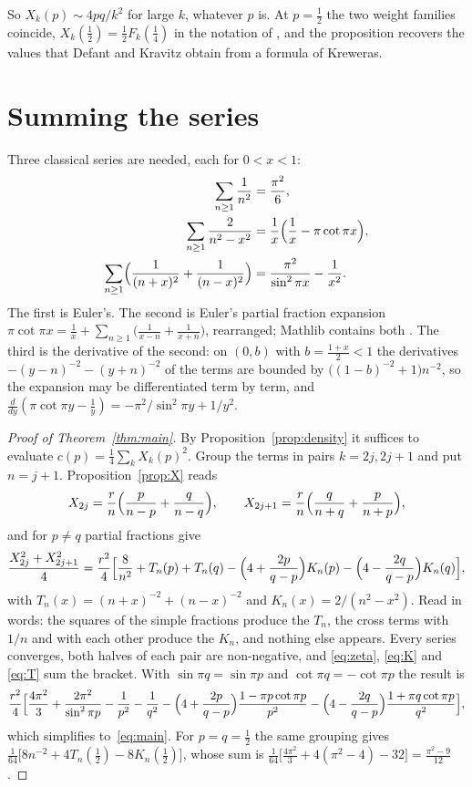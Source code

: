 \documentclass[11pt]{amsart}
\theoremstyle{definition}
\theoremstyle{remark}
\begin{document}
So $X_k(p)\sim 4pq/k^2$ for large $k$, whatever $p$ is. At $p=\tfrac12$ the two weight families
coincide, $X_k(\tfrac12)=\tfrac12F_k(\tfrac14)$ in the notation of \cite[Section~6]{DK24}, and the
proposition recovers the values that Defant and Kravitz obtain from a formula of Kreweras.

\section{Summing the series}\label{sec:sum}

Three classical series are needed, each for $0<x<1$:
\begin{align}
\sum_{n\ge1}\frac1{n^2}&=\frac{\pi^2}6,\label{eq:zeta}\\
\sum_{n\ge1}\frac{2}{n^2-x^2}&=\frac1x\Bigl(\frac1x-\pi\cot\pi x\Bigr),\label{eq:K}\\
\sum_{n\ge1}\Bigl(\frac1{(n+x)^2}+\frac1{(n-x)^2}\Bigr)&=\frac{\pi^2}{\sin^2\pi x}-\frac1{x^2}.\label{eq:T}
\end{align}
The first is Euler's. The second is Euler's partial fraction expansion
$\pi\cot\pi x=\frac1x+\sum_{n\ge1}\bigl(\frac1{x-n}+\frac1{x+n}\bigr)$, rearranged; Mathlib contains both
\cite{Mathlib}. The third is the derivative of the second: on $(0,b)$ with $b=\frac{1+x}2<1$ the
derivatives $-(y-n)^{-2}-(y+n)^{-2}$ of the terms are bounded by $\bigl((1-b)^{-2}+1\bigr)n^{-2}$, so the
expansion may be differentiated term by term, and $\frac{d}{dy}(\pi\cot\pi y-\frac1y)=
-\pi^2/\sin^2\pi y+1/y^2$.

\begin{proof}[Proof of Theorem~\ref{thm:main}]
By Proposition~\ref{prop:density} it suffices to evaluate $c(p)=\frac14\sum_kX_k(p)^2$. Group the terms
in pairs $k=2j,2j+1$ and put $n=j+1$. Proposition~\ref{prop:X} reads
\[
X_{2j}=\frac rn\Bigl(\frac p{n-p}+\frac q{n-q}\Bigr),\qquad X_{2j+1}=\frac rn\Bigl(\frac q{n+q}+\frac p{n+p}\Bigr),
\]
and for $p\ne q$ partial fractions give
\begin{multline*}
\frac{X_{2j}^2+X_{2j+1}^2}4=\frac{r^2}4\Bigl[\frac8{n^2}+T_n(p)+T_n(q)
-\Bigl(4+\frac{2p}{q-p}\Bigr)K_n(p)-\Bigl(4-\frac{2q}{q-p}\Bigr)K_n(q)\Bigr],
\end{multline*}
with $T_n(x)=(n+x)^{-2}+(n-x)^{-2}$ and $K_n(x)=2/(n^2-x^2)$. Read in words: the squares of the
simple fractions produce the $T_n$, the cross terms with $1/n$ and with each other produce the $K_n$,
and nothing else appears. Every series converges, both halves of each pair are non-negative, and
\eqref{eq:zeta}, \eqref{eq:K} and \eqref{eq:T} sum the bracket. With $\sin\pi q=\sin\pi p$ and $\cot\pi q=-\cot\pi p$
the result is
\[
\frac{r^2}4\Bigl[\frac{4\pi^2}3+\frac{2\pi^2}{\sin^2\pi p}-\frac1{p^2}-\frac1{q^2}
-\Bigl(4+\frac{2p}{q-p}\Bigr)\frac{1-\pi p\cot\pi p}{p^2}
-\Bigl(4-\frac{2q}{q-p}\Bigr)\frac{1+\pi q\cot\pi p}{q^2}\Bigr],
\]
which simplifies to~\eqref{eq:main}. For $p=q=\tfrac12$ the same grouping gives
$\frac1{64}\bigl[8n^{-2}+4T_n(\tfrac12)-8K_n(\tfrac12)\bigr]$, whose sum is
$\frac1{64}\bigl[\tfrac{4\pi^2}{3}+4(\pi^2-4)-32\bigr]=\tfrac{\pi^2-9}{12}$.
\end{proof}
\end{document}
